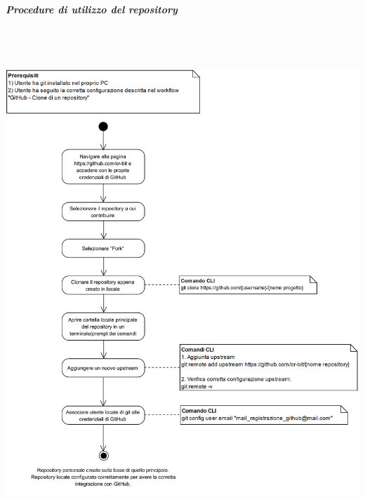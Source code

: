 \subparagraph{Procedure di utilizzo del repository}\mbox{}


\begin{samepage}
	\mbox{}\\	
	\begin{center}
		\includegraphics[height=17cm]{../../documenti/NormeDiProgetto/DiagrammiProcedure/GitHub-CloneDiUnRepository.png}
	\end{center}
\end{samepage}

